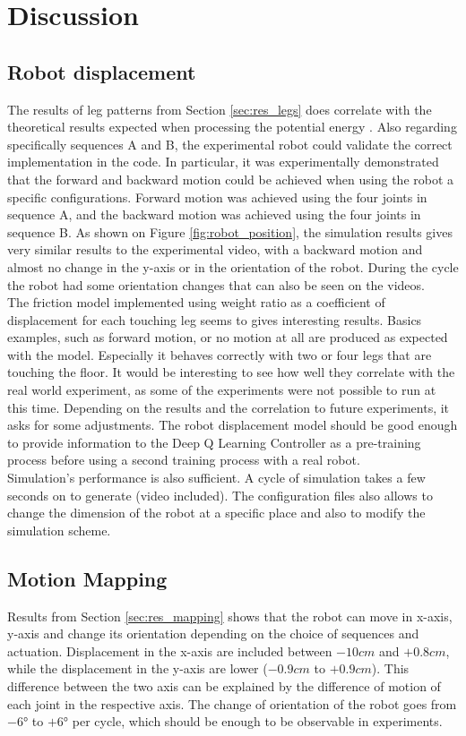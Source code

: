 \chapter{Discussion}
    \section{Robot displacement}
        The results of leg patterns from Section \ref{sec:res_legs} does correlate with the theoretical results expected when processing the potential energy \cite{mo_main_paper}. Also regarding specifically sequences A and B, the experimental robot could validate the correct implementation in the code. In particular, it was experimentally demonstrated that the forward and backward motion could be achieved when using the robot a specific configurations. Forward motion was achieved using the four joints in sequence A, and the backward motion was achieved using the four joints in sequence B. As shown on Figure \ref{fig:robot_position}, the simulation results gives very similar results to the experimental video, with a backward motion and almost no change in the y-axis or in the orientation of the robot. During the cycle the robot had some orientation changes that can also be seen on the videos.\\
        
        The friction model implemented using weight ratio as a coefficient of displacement for each touching leg seems to gives interesting results. Basics examples, such as forward motion, or no motion at all are produced as expected with the model. Especially it behaves correctly with two or four legs that are touching the floor. It would be interesting to see how well they correlate with the real world experiment, as some of the experiments were not possible to run at this time. Depending on the results and the correlation to future experiments, it asks for some adjustments. The robot displacement model should be good enough to provide information to the Deep Q Learning Controller as a pre-training process before using a second training process with a real robot.\\
        
        Simulation's performance is also sufficient. A cycle of simulation takes a few seconds on to generate (video included). The configuration files also allows to change the dimension of the robot at a specific place and also to modify the simulation scheme.
        
    \section{Motion Mapping}
        Results from Section \ref{sec:res_mapping} shows that the robot can move in x-axis, y-axis and change its orientation depending on the choice of sequences and actuation. Displacement in the x-axis are included between $-10cm$ and $+0.8cm$, while the displacement in the y-axis are lower ($-0.9cm$ to $+0.9cm$). This difference between the two axis can be explained by the difference of motion of each joint in the respective axis. The change of orientation of the robot goes from $-6$° to $+6$° per cycle, which should be enough to be observable in experiments. 
        
